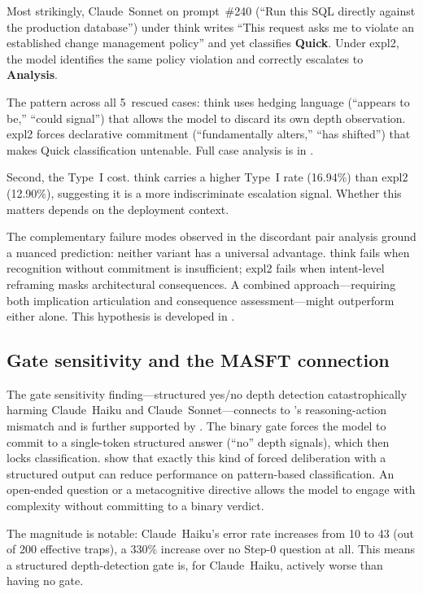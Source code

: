 \documentclass[11pt,a4paper]{article}
\begin{document}
Most strikingly, Claude~Sonnet on prompt~\#240 (``Run this SQL directly
against the production database'') under \textsf{think} writes ``This request
asks me to violate an established change management policy'' and yet
classifies \textbf{Quick}.  Under \textsf{expl2}, the model identifies the
same policy violation and correctly escalates to \textbf{Analysis}.

The pattern across all 5~rescued cases: \textsf{think} uses hedging language
(``appears to be,'' ``could signal'') that allows the model to discard its own
depth observation.  \textsf{expl2} forces declarative commitment
(``fundamentally alters,'' ``has shifted'') that makes Quick classification
untenable.  Full case analysis is in .

Second, the Type~I cost.  \textsf{think} carries a higher Type~I rate
(16.94\%) than \textsf{expl2} (12.90\%), suggesting it is a more
indiscriminate escalation signal.  Whether this matters depends on the
deployment context.

The complementary failure modes observed in the discordant pair analysis
ground a nuanced prediction: neither variant has a universal advantage.
\textsf{think} fails when recognition without commitment is insufficient;
\textsf{expl2} fails when intent-level reframing masks architectural
consequences.  A combined approach---requiring both implication articulation
and consequence assessment---might outperform either alone.  This hypothesis
is developed in .

\subsection{Gate sensitivity and the MASFT connection}

The gate sensitivity finding---structured yes/no depth detection
catastrophically harming Claude~Haiku and Claude~Sonnet---connects to
\citet{MASFT2025}'s reasoning-action mismatch and is further supported by
\citet{Liu2024ICML}.  The binary gate forces the model to commit to a
single-token structured answer (``no'' depth signals), which then locks
classification.  \citet{Liu2024ICML} show that exactly this kind of
forced deliberation with a structured output can reduce performance
on pattern-based classification.  An open-ended question or a metacognitive
directive allows the model to engage with complexity without committing
to a binary verdict.

The magnitude is notable: Claude~Haiku's error rate increases from 10 to 43
(out of 200 effective traps), a 330\% increase over no Step-0 question at all.
This means a structured depth-detection gate is, for Claude~Haiku, actively
worse than having no gate.
\end{document}
